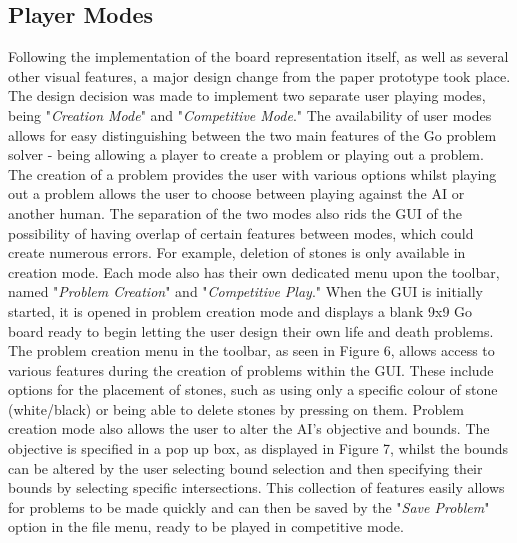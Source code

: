 \documentclass{l3proj}
\begin{document}
\subsection{Player Modes}

Following the implementation of the board representation itself, as well as several other visual features, a major design change from the paper prototype took place. The design decision was made to implement two separate user playing modes, being "\textit{Creation Mode}" and "\textit{Competitive Mode}." The availability of user modes allows for easy distinguishing between the two main features of the Go problem solver - being allowing a player to create a problem or playing out a problem. The creation of a problem provides the user with various options whilst playing out a problem allows the user to choose between playing against the AI or another human. The separation of the two modes also rids the GUI of the possibility of having overlap of certain features between modes, which could create numerous errors. For example, deletion of stones is only available in creation mode. Each mode also has their own dedicated menu upon the toolbar, named "\textit{Problem Creation}" and "\textit{Competitive Play}."
When the GUI is initially started, it is opened in problem creation mode and displays a blank 9x9 Go board ready to begin letting the user design their own life and death problems. The problem creation menu in the toolbar, as seen in Figure 6, allows access to various features during the creation of problems within the GUI. These include options for the placement of stones, such as using only a specific colour of stone (white/black) or being able to delete stones by pressing on them. Problem creation mode also allows the user to alter the AI's objective and bounds. The objective is specified in a pop up box, as displayed in Figure 7, whilst the bounds can be altered by the user selecting bound selection and then specifying their bounds by selecting specific intersections. This collection of features easily allows for problems to be made quickly and can then be saved by the "\textit{Save Problem}" option in the file menu, ready to be played in competitive mode.
\end{document}
